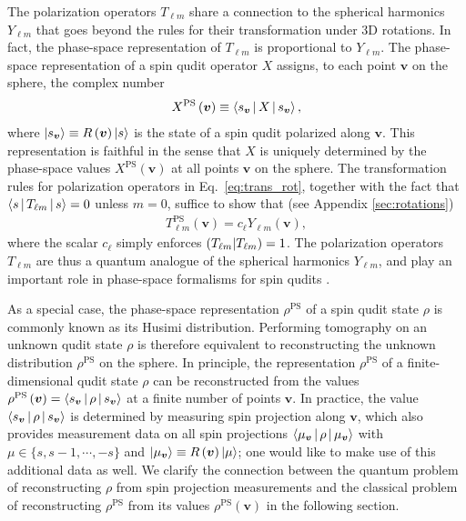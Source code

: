 \documentclass[nofootinbib,twocolumn]{revtex4-1}
\renewcommand{\t}{\text} %
\newcommand{\p}[1]{\left(#1\right)} %
\newcommand{\bk}{\Braket} %
\renewcommand{\set}[1]{\{#1\}} %
\def\obk#1{\mathinner{({#1})}}
\begin{document}
The polarization operators $T_{\ell m}$ share a connection to the spherical harmonics $Y_{\ell m}$ that goes beyond the rules for their transformation under 3D rotations.
In fact, the phase-space representation of $T_{\ell m}$ is proportional to $Y_{\ell m}$.
The phase-space representation of a spin qudit operator $X$ assigns, to each point $\bm v$ on the sphere, the complex number
\begin{align}
  X^{\t{PS}}\p{\bm v} \equiv \bk{s_{\bm v}|X|s_{\bm v}},
\end{align}
where $\ket{s_{\bm v}}\equiv R\p{\bm v}\ket{s}$ is the state of a spin qudit polarized along $\bm v$.
This representation is faithful in the sense that $X$ is uniquely determined by the phase-space values $X^{\t{PS}}\p{\bm v}$ at all points $\bm v$ on the sphere.
The transformation rules for polarization operators in Eq.~\eqref{eq:trans_rot}, together with the fact that $\bk{s|T_{\ell m}|s}=0$ unless $m=0$, suffice to show that (see Appendix \ref{sec:rotations})
\begin{align}
  T_{\ell m}^{\t{PS}}\p{\bm v} = c_\ell Y_{\ell m}\p{\bm v},
\end{align}
where the scalar $c_\ell$ simply enforces $\obk{T_{\ell m}|T_{\ell m}}=1$.
The polarization operators $T_{\ell m}$ are thus a quantum analogue of the spherical harmonics $Y_{\ell m}$, and play an important role in phase-space formalisms for spin qudits \cite{li2013weylwignermoyal}.

As a special case, the phase-space representation $\rho^{\t{PS}}$ of a spin qudit state $\rho$ is commonly known as its Husimi distribution.
Performing tomography on an unknown qudit state $\rho$ is therefore equivalent to reconstructing the unknown distribution $\rho^{\t{PS}}$ on the sphere.
In principle, the representation $\rho^{\t{PS}}$ of a finite-dimensional qudit state $\rho$ can be reconstructed from the values $\rho^{\t{PS}}\p{\bm v}=\bk{s_{\bm v}|\rho|s_{\bm v}}$ at a finite number of points $\bm v$.
In practice, the value $\bk{s_{\bm v}|\rho|s_{\bm v}}$ is determined by measuring spin projection along $\bm v$, which also provides measurement data on all spin projections $\bk{\mu_{\bm v}|\rho|\mu_{\bm v}}$ with $\mu\in\set{s,s-1,\cdots,-s}$ and $\ket{\mu_{\bm v}}\equiv R\p{\bm v}\ket{\mu}$; one would like to make use of this additional data as well.
We clarify the connection between the quantum problem of reconstructing $\rho$ from spin projection measurements and the classical problem of reconstructing $\rho^{\t{PS}}$ from its values $\rho^{\t{PS}}\p{\bm v}$ in the following section.
\end{document}
